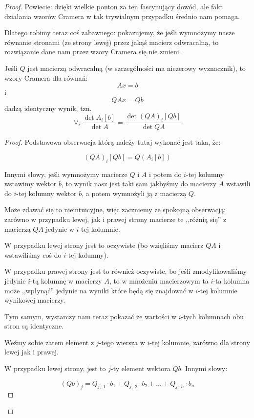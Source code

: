 \begin{proof}
	Powiecie: dzięki wielkie ponton za ten fascynujący dowód, ale fakt działania wzorów Cramera w tak trywialnym przypadku średnio nam pomaga.

	Dlatego robimy teraz coś zabawnego: pokazujemy, że jeśli wymnożymy nasze równanie stronami (ze strony lewej) przez jakąś macierz odwracalną, to rozwiązanie dane nam przez wzory Cramera się nie zmieni.

	\begin{lemma}
		Jeśli \(Q\) jest macierzą odwracalną (w szczególności ma niezerowy wyznacznik), to wzory Cramera dla równań:
		\[
			Ax = b
		\]
		i
		\[
			QAx = Qb
		\]
		dadzą identyczny wynik, tzn.
		\[
			\forall_{i} \; \frac{\det{A_i[b]}}{\det{A}} = \frac{\det{(QA)_i[Qb]}}{\det{QA}}
		\]
	\end{lemma}
	\begin{proof}
		Podstawowa obserwacja którą należy tutaj wykonać jest taka, że:

		\[
			(QA)_i[Qb] = Q(A_i[b])
		\]

		Innymi słowy, jeśli wymnożymy macierze \(Q\) i \(A\) i potem do \(i\)-tej kolumny wstawimy wektor \(b\), to wynik nasz jest taki sam jakbyśmy do macierzy \(A\) wstawili do \(i\)-tej kolumny wektor \(b\), a potem wymnożyli ją z macierzą \(Q\).

		Może zdawać się to nieintuicyjne, więc zaczniemy ze spokojną obserwacją: zarówno w przypadku lewej, jak i prawej strony macierze te ,,różnią się'' z macierzą \(QA\) jedynie w \(i\)-tej kolumnie.

		W przypadku lewej strony jest to oczywiste (bo wzięliśmy macierz \(QA\) i wstawiliśmy coś do \(i\)-tej kolumny).

		W przypadku prawej strony jest to również oczywiste, bo jeśli zmodyfikowaliśmy jedynie \(i\)-tą kolumnę w macierzy \(A\), to w mnożeniu macierzowym ta \(i\)-ta kolumna może ,,wpłynąć'' jedynie na wyniki które będą się znajdować w \(i\)-tej kolumnie wynikowej macierzy.

		Tym samym, wystarczy nam teraz pokazać że wartości w \(i\)-tych kolumnach obu stron są identyczne.

		Weźmy sobie zatem element z \(j\)-tego wiersza w \(i\)-tej kolumnie, zarówno dla strony lewej jak i prawej.

		W przypadku lewej strony, jest to \(j\)-ty element wektora \(Qb\). Innymi słowy:

		\[
			(Qb)_{j} = Q_{j, \; 1} \cdot b_1 + Q_{j, \; 2} \cdot b_2 + \dots + Q_{j, \; n} \cdot b_n
		\]


\end{proof}
\end{proof}
